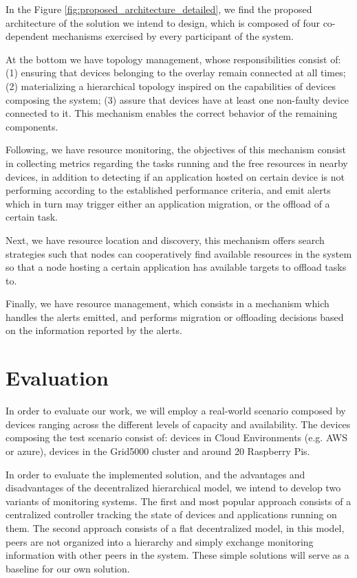 In the Figure \ref{fig:proposed_architecture_detailed}, we find the proposed architecture of the solution we intend to design, which is composed of four co-dependent mechanisms exercised by every participant of the system.

At the bottom we have topology management, whose responsibilities consist of: (1) ensuring that devices belonging to the overlay remain connected at all times; (2) materializing a hierarchical topology inspired on the capabilities of devices composing the system; (3) assure that devices have at least one non-faulty device connected to it. This mechanism enables the correct behavior of the remaining components.

Following, we have resource monitoring, the objectives of this mechanism consist in collecting metrics regarding the tasks running and the free resources in nearby devices, in addition to detecting if an application hosted on certain device is not performing according to the established performance criteria, and emit alerts which in turn may trigger either an application migration, or the offload of a certain task.

Next, we have resource location and discovery, this mechanism offers search strategies such that nodes can cooperatively find available resources in the system so that a node hosting a certain application has available targets to offload tasks to.

Finally, we have resource management, which consists in a mechanism which handles the alerts emitted, and performs migration or offloading decisions based on the information reported by the alerts.

\section{Evaluation}  

In order to evaluate our work, we will employ a real-world scenario composed by devices ranging across the different levels of capacity and availability. The devices composing the test scenario consist of: devices in Cloud Environments (e.g. AWS or azure), devices in the Grid5000 cluster and around 20 Raspberry Pis.

In order to evaluate the implemented solution, and the advantages and disadvantages of the decentralized hierarchical model, we intend to develop two variants of monitoring systems. The first and most popular approach consists of a centralized controller tracking the state of devices and applications running on them. The second approach consists of a flat decentralized model, in this model, peers are not organized into a hierarchy and simply exchange monitoring information with other peers in the system. These simple solutions will serve as a baseline for our own solution.

